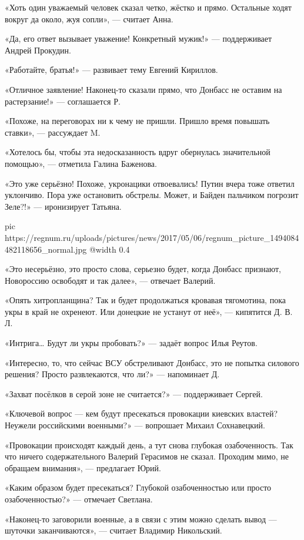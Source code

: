 «Хоть один уважаемый человек сказал четко, жёстко и прямо. Остальные ходят вокруг да около, жуя сопли», — считает Анна.

«Да, его ответ вызывает уважение! Конкретный мужик!» — поддерживает Андрей Прокудин.

«Работайте, братья!» — развивает тему Евгений Кириллов.

«Отличное заявление! Наконец-то сказали прямо, что Донбасс не оставим на растерзание!» — соглашается Р.

«Похоже, на переговорах ни к чему не пришли. Пришло время повышать ставки», — рассуждает M.

«Хотелось бы, чтобы эта недосказанность вдруг обернулась значительной помощью», — отметила Галина Баженова.

«Это уже серьёзно! Похоже, укронацики отвоевались! Путин вчера тоже ответил
уклончиво. Пора уже остановить обстрелы. Может, и Байден пальчиком погрозит
Зеле?!» — иронизирует Татьяна.

\ifcmt
  pic https://regnum.ru/uploads/pictures/news/2017/05/06/regnum_picture_1494084482118656_normal.jpg
  @width 0.4
\fi

«Это несерьёзно, это просто слова, серьезно будет, когда Донбасс признают,
Новороссию освободят и так далее», — отвечает Валерий.

«Опять хитропланщина? Так и будет продолжаться кровавая тягомотина, пока укры в
край не охренеют. Или донецкие не устанут от неё», — кипятится Д. В. Л.

«Интрига… Будут ли укры пробовать?» — задаёт вопрос Илья Реутов.

«Интересно, то, что сейчас ВСУ обстреливают Донбасс, это не попытка силового
решения? Просто развлекаются, что ли?» — напоминает Д.

«Захват посёлков в серой зоне не считается?» — поддерживает Сергей.

«Ключевой вопрос — кем будут пресекаться провокации киевских властей? Неужели
российскими военными?» — вопрошает Михаил Сохнавецкий.

«Провокации происходят каждый день, а тут снова глубокая озабоченность. Так что
ничего содержательного Валерий Герасимов не сказал. Проходим мимо, не обращаем
внимания», — предлагает Юрий.

«Каким образом будет пресекаться? Глубокой озабоченностью или просто
озабоченностью?» — отмечает Светлана.

«Наконец-то заговорили военные, а в связи с этим можно сделать вывод — шуточки
заканчиваются», — считает Владимир Никольский.

